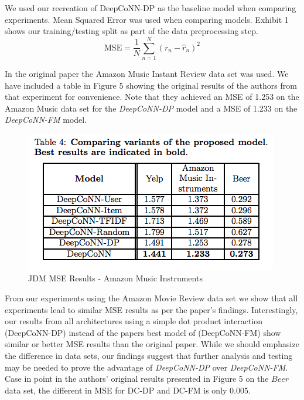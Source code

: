 \documentclass[10pt,twocolumn,letterpaper]{article}
\begin{document}
We used our recreation of DeepCoNN-DP as the baseline model when comparing experiments. Mean Squared Error was used when comparing models. Exhibit 1 shows our training/testing split as part of the data preprocessing step.
$$
\mbox{MSE} = \frac{1}{N}\sum_{n=1}^{N}(r_{n} - \hat{r}_{n})^2
$$

In the original paper the Amazon Music Instant Review data set was used. We have included a table in Figure 5 showing the original results of the authors from that experiment for convenience. Note that they achieved an MSE of 1.253 on the Amazon Music data set for the \textit{DeepCoNN-DP} model and a MSE of 1.233 on the \textit{DeepCoNN-FM} model. 

\begin{figure}[!ht]
\begin{center}
\includegraphics[scale=0.50]{orig_mses.png}
\caption{JDM MSE Results - Amazon Music Instruments}
\end{center}
\end{figure}

From our experiments using the Amazon Movie Review data set we show that all experiments lead to similar MSE results as per the paper's findings. Interestingly, our results from all architectures using a simple dot product interaction (DeepCoNN-DP) instead of the papers best model of (DeepCoNN-FM) show similar or better MSE results than the original paper. While we should emphasize the difference in data sets, our findings suggest that further analysis and testing may be needed to prove the advantage of \textit{DeepCoNN-DP} over \textit{DeepCoNN-FM}. Case in point in the authors' original results presented in Figure 5 on the $Beer$ data set, the different in MSE for DC-DP and DC-FM is only 0.005.
\end{document}
